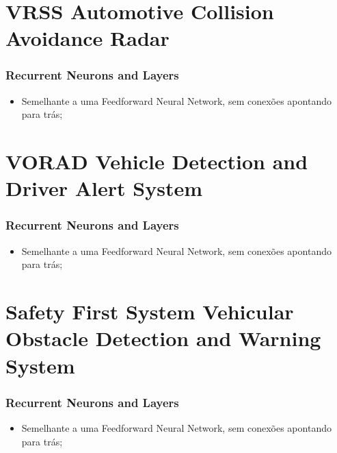\documentclass[xcolor=dvipsnames, aspectratio=169]{beamer}
\begin{document}
\section[VRSS Automotive Collision Avoidance Radar]{VRSS Automotive Collision Avoidance Radar} 

\begin{frame}
\frametitle{Recurrent Neurons and Layers}
	\begin{itemize}
		\item Semelhante a uma Feedforward Neural Network, sem conexões apontando para trás;
	\end{itemize}
\end{frame}


\section[VORAD Vehicle Detection and Driver Alert System]{VORAD Vehicle Detection and Driver Alert System} 

\begin{frame}
\frametitle{Recurrent Neurons and Layers}
	\begin{itemize}
		\item Semelhante a uma Feedforward Neural Network, sem conexões apontando para trás;
	\end{itemize}
\end{frame}


\section[Safety First System Vehicular Obstacle Detection and Warning System]{Safety First System Vehicular Obstacle Detection and Warning System} 

\begin{frame}
\frametitle{Recurrent Neurons and Layers}
	\begin{itemize}
		\item Semelhante a uma Feedforward Neural Network, sem conexões apontando para trás;
	\end{itemize}
\end{frame}
\end{document}
